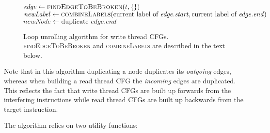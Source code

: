 \begin{figure}
\begin{algorithmic}
       \State $\mathit{edge} \gets \textsc{findEdgeToBeBroken}(t, \{\})$
       \State $\mathit{newLabel} \gets \textsc{combineLabels}(\text{current label of } \mathit{edge}.\mathit{start}, \text{current label of } \mathit{edge}.\mathit{end})$
       \Else
           \State $\mathit{newNode} \gets \text{duplicate } \mathit{edge}.\mathit{end}$
           \EndFor
       \EndIf
    \EndWhile
  \EndFor
\end{algorithmic}
\caption{Loop unrolling algorithm for write thread CFGs.
  \textsc{findEdgeToBeBroken} and \textsc{combineLabels} are described
  in the text below.}
\label{fig:derive:store_cfg_unroll_alg}
\end{figure}

Note that in this algorithm duplicating a node duplicates its
\emph{outgoing} edges, whereas when building a read thread CFG the
\emph{incoming} edges are duplicated.  This reflects the fact that
write thread CFGs are built up forwards from the interfering
instructions while read thread CFGs are built up backwards from the
target instruction.

The algorithm relies on two utility functions:

